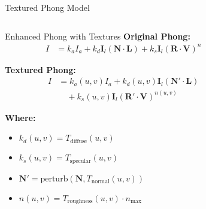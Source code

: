 \begin{frame}{Textured Phong Model}
  \begin{columns}
    \begin{column}{0.6\textwidth}
      \begin{mathbox}{Enhanced Phong with Textures}
        \footnotesize
        \textbf{Original Phong:}
        \begin{align*}
          I &= k_a I_a + k_d \mathbf{I}_l (\mathbf{N} \cdot \mathbf{L}) + k_s \mathbf{I}_l (\mathbf{R} \cdot \mathbf{V})^n
        \end{align*}

        \vspace{0.3cm}
        \textbf{Textured Phong:}
        \begin{align*}
          I &= k_a(u,v) I_a + k_d(u,v) \mathbf{I}_l (\mathbf{N}' \cdot \mathbf{L}) \\
          &\quad + k_s(u,v) \mathbf{I}_l (\mathbf{R}' \cdot \mathbf{V})^{n(u,v)}
        \end{align*}

        \vspace{0.3cm}
        \textbf{Where:}
        \begin{itemize}
          \item $k_d(u,v) = T_{\text{diffuse}}(u,v)$
          \item $k_s(u,v) = T_{\text{specular}}(u,v)$
          \item $\mathbf{N}' = \text{perturb}(\mathbf{N}, T_{\text{normal}}(u,v))$
          \item $n(u,v) = T_{\text{roughness}}(u,v) \cdot n_{\max}$
        \end{itemize}
      \end{mathbox}
    \end{column}
    \begin{column}{0.4\textwidth}
\end{column}
\end{columns}
\end{frame}
